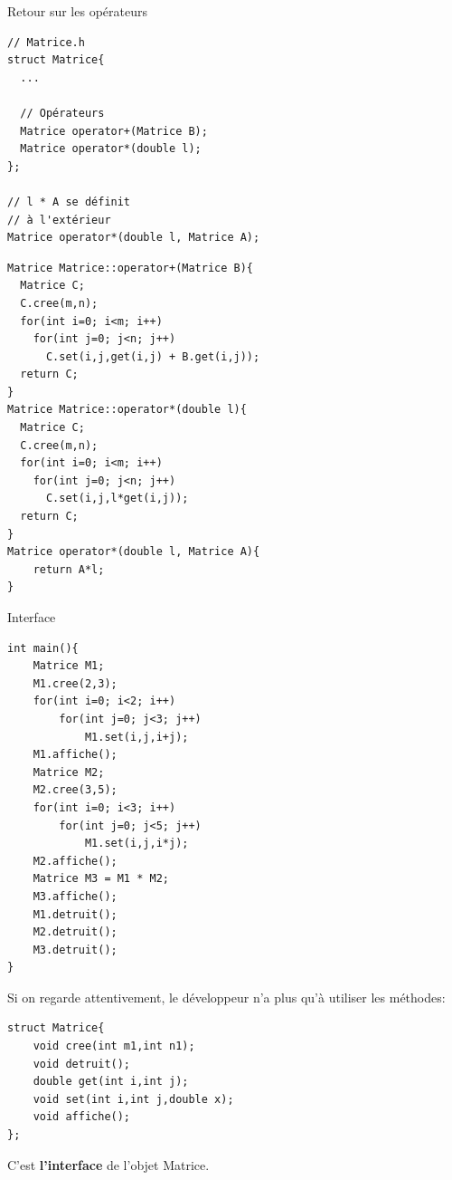\begin{frame}[fragile]{Retour sur les opérateurs}
\begin{minipage}{0.42\linewidth}      
\begin{verbatim}
// Matrice.h
struct Matrice{
  ...

  // Opérateurs
  Matrice operator+(Matrice B);
  Matrice operator*(double l);
};

// l * A se définit
// à l'extérieur
Matrice operator*(double l, Matrice A);
\end{verbatim}
\end{minipage}
\hfill
\begin{minipage}{0.56\linewidth}
\begin{verbatim}
Matrice Matrice::operator+(Matrice B){
  Matrice C;
  C.cree(m,n);
  for(int i=0; i<m; i++)
    for(int j=0; j<n; j++)
      C.set(i,j,get(i,j) + B.get(i,j));
  return C;
}
Matrice Matrice::operator*(double l){
  Matrice C;
  C.cree(m,n);
  for(int i=0; i<m; i++)
    for(int j=0; j<n; j++)
      C.set(i,j,l*get(i,j));
  return C;
}
Matrice operator*(double l, Matrice A){
    return A*l;
}
\end{verbatim}
\end{minipage}
\end{frame}

\begin{frame}[fragile]{Interface}

    \begin{minipage}{0.47\linewidth}
        
            \begin{verbatim}
int main(){
    Matrice M1;
    M1.cree(2,3);
    for(int i=0; i<2; i++)
        for(int j=0; j<3; j++)
            M1.set(i,j,i+j);
    M1.affiche();
    Matrice M2;
    M2.cree(3,5);
    for(int i=0; i<3; i++)
        for(int j=0; j<5; j++)
            M1.set(i,j,i*j);
    M2.affiche();
    Matrice M3 = M1 * M2;
    M3.affiche();
    M1.detruit();
    M2.detruit();
    M3.detruit();
}
            \end{verbatim}
        
    \end{minipage}
    \hfill
    \begin{minipage}{0.47\linewidth}
Si on regarde attentivement, le développeur n'a plus qu'à utiliser les méthodes:
\begin{verbatim}
struct Matrice{
    void cree(int m1,int n1);
    void detruit();
    double get(int i,int j);
    void set(int i,int j,double x);
    void affiche();
};
\end{verbatim}
    

C'est \textbf{l'interface} de l'objet Matrice.
    \end{minipage}
\end{frame}

